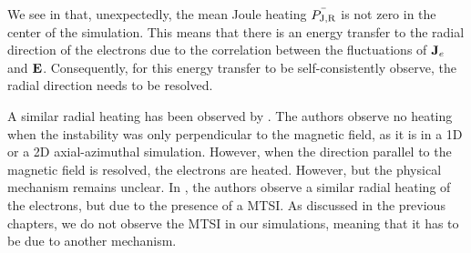   We see in  that, unexpectedly,  the mean Joule heating $\bar{P_{\rm J, R}}$ is not zero in the center of the simulation.
  This means that there is an energy transfer to the radial direction of the electrons due to the correlation between the fluctuations of ${\mathbf J_e}$ and ${\mathbf E}$.
  Consequently, for this energy transfer to be self-consistently observe, the radial direction needs to be resolved.

  A similar radial heating has been observed by \citet{heron2013}.
  The authors observe no heating when the instability was only perpendicular to the magnetic field, as it is in a \ac{1D} or a \ac{2D} axial-azimuthal simulation.
  However, when the direction parallel to the magnetic field is resolved, the electrons are heated.
  However, but the physical mechanism remains unclear.
  In \citet{janhunen}, the authors observe a similar radial heating of the electrons, but due to the presence of a \ac{MTSI}.
  As discussed in the previous chapters, we do not observe the \ac{MTSI} in our simulations, meaning that it has to be due to another mechanism.


